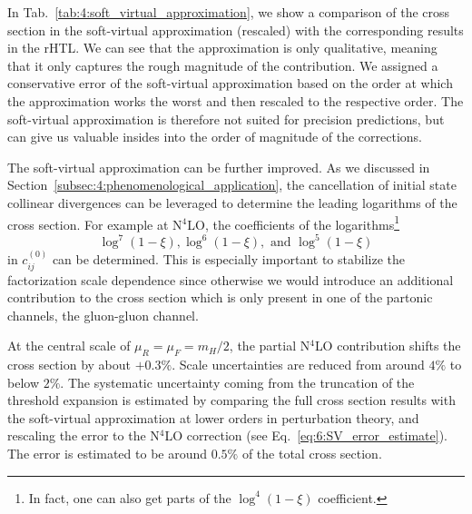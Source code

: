 In Tab.~\ref{tab:4:soft_virtual_approximation}, we show a comparison of the cross section in the soft-virtual approximation (rescaled) with the corresponding results in the \acs{rHTL}. We can see that the approximation is only qualitative, meaning that it only captures the rough magnitude of the contribution. We assigned a conservative error of the soft-virtual approximation based on the order at which the approximation works the worst and then rescaled to the respective order. The soft-virtual approximation is therefore not suited for precision predictions, but can give us valuable insides into the order of magnitude of the corrections.

The soft-virtual approximation can be further improved. As we discussed in Section~\ref{subsec:4:phenomenological_application}, the cancellation of initial state collinear divergences can be leveraged to determine the leading logarithms of the cross section. For example at N${}^4$LO, the coefficients of the logarithms\footnote{In fact, one can also get parts of the $\log^4 (1 - \xi)$ coefficient.}
\begin{equation}
\log^{7} (1 - \xi), \log^{6} (1 - \xi), \text{ and } \log^{5} (1 - \xi)
\end{equation}
in $c_{ij}^{(0)}$ can be determined. This is especially important to stabilize the factorization scale dependence since otherwise we would introduce an additional contribution to the cross section which is only present in one of the partonic channels, the gluon-gluon channel.

At the central scale of $\mu_R = \mu_F = m_H/2$, the partial N${}^4$LO contribution shifts the cross section by about $+0.3\%$. Scale uncertainties are reduced from around $4\%$ to below $2\%$. The systematic uncertainty coming from the truncation of the threshold expansion is estimated by comparing the full cross section results with the soft-virtual approximation at lower orders in perturbation theory, and rescaling the error to the N${}^4$LO correction (see Eq.~\eqref{eq:6:SV_error_estimate}). The error is estimated to be around $0.5\%$ of the total cross section.

